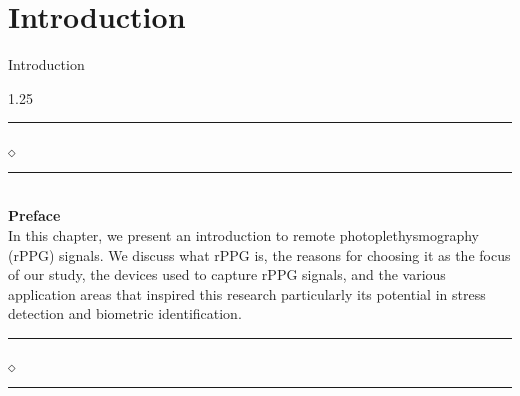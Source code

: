 \chapter[Introduction]{Introduction}{Introduction}\label{chapter_thesis_introduction}


\begin{spacing}{1.25}
\vskip 20pt
\noindent
\rule{0.49\textwidth}{0.75pt} $_{\Diamond}$ \rule{0.49\textwidth}{0.75pt}\\
{\Large{\textbf{Preface}}}\\
In this chapter, we present an introduction to remote photoplethysmography (rPPG) signals. We discuss what rPPG is, the reasons for choosing it as the focus of our study, the devices used to capture rPPG signals, and the various application areas that inspired this research particularly its potential in stress detection and biometric identification.\\
\rule{0.49\textwidth}{0.75pt} $_{\Diamond}$ \rule{0.49\textwidth}{0.75pt}
\end{spacing}
\newpage






